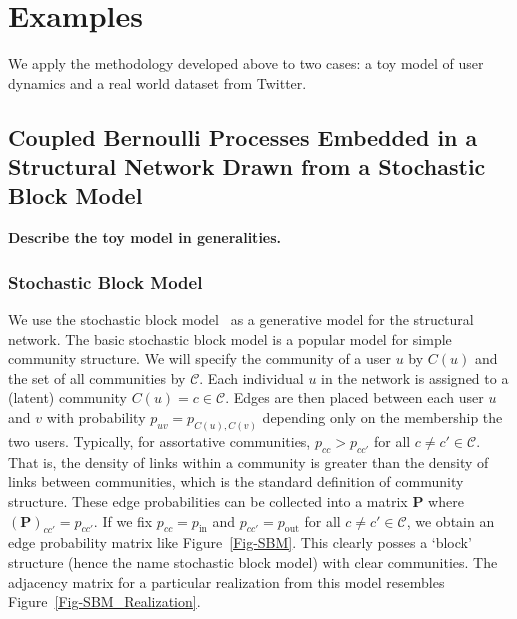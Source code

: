 \documentclass[12pt]{article}
\begin{document}
\section{Examples}

We apply the methodology developed above to two cases: a toy model of user dynamics and a real world dataset from Twitter.

\subsection{Coupled Bernoulli Processes Embedded in a Structural Network Drawn from a Stochastic Block Model}

\textbf{Describe the toy model in generalities.}

\subsubsection{Stochastic Block Model}

\label{Sec-SBM}

We use the stochastic block model~\cite{holland1983stochastic} as a generative model for the structural network. The basic stochastic block model is a popular model for simple community structure. We will specify the community of a user $u$ by $C(u)$ and the set of all communities by $\mathcal{C}$. Each individual $u$ in the network is assigned to a (latent) community $C(u) = c \in \mathcal{C}$. Edges are then placed between each user $u$ and $v$ with probability $p_{uv} = p_{C(u), C(v)}$ depending only on the membership the two users. Typically, for assortative communities, $p_{cc} > p_{cc'}$ for all $c \neq c' \in \mathcal{C}$. That is, the density of links within a community is greater than the density of links between communities, which is the standard definition of community structure. These edge probabilities can be collected into a matrix $\mathbf{P}$ where $(\mathbf{P})_{cc'} = p_{cc'}.$ If we fix $p_{cc} = p_{\text{in}}$ and $p_{cc'} = p_{\text{out}}$ for all $c \neq c' \in \mathcal{C}$, we obtain an edge probability matrix like Figure~\ref{Fig-SBM}. This clearly posses a `block' structure (hence the name stochastic block model) with clear communities. The adjacency matrix for a particular realization from this model resembles Figure~\ref{Fig-SBM_Realization}.
\end{document}
